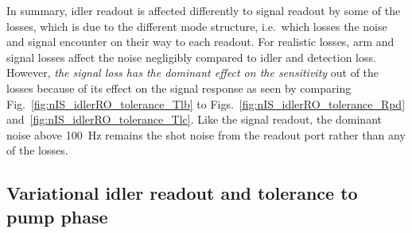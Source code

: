 In summary, idler readout is affected differently to signal readout by some of the losses, which is due to the different mode structure, i.e.\ which losses the noise and signal encounter on their way to each readout.
For realistic losses, arm and signal losses affect the noise negligibly compared to idler and detection loss. However, \emph{the signal loss has the dominant effect on the sensitivity} out of the losses because of its effect on the signal response as seen by comparing Fig.~\ref{fig:nIS_idlerRO_tolerance_Tlb} to Figs.~\ref{fig:nIS_idlerRO_tolerance_Rpd} and~\ref{fig:nIS_idlerRO_tolerance_Tlc}. Like the signal readout, the dominant noise above 100~Hz remains the shot noise from the readout port rather than any of the losses.



\subsection{Variational idler readout and tolerance to pump phase}
\label{sec:idlerRO_pump_phase}

